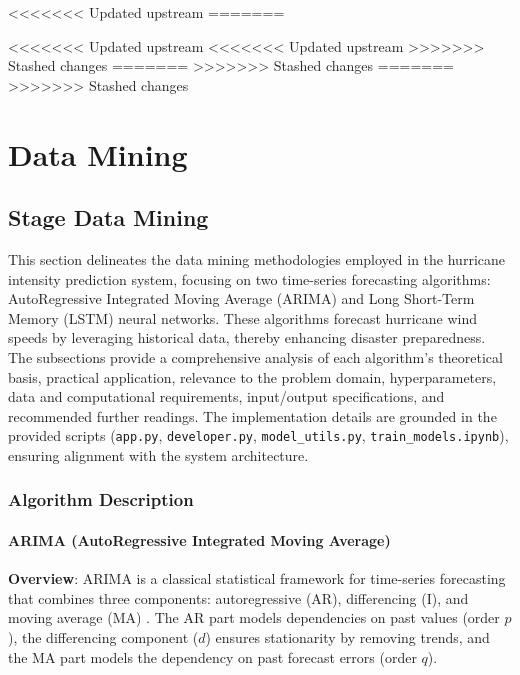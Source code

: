 <<<<<<< Updated upstream
=======
%
%


<<<<<<< Updated upstream
<<<<<<< Updated upstream
>>>>>>> Stashed changes
=======
>>>>>>> Stashed changes
=======
>>>>>>> Stashed changes
\chapter{Data Mining}

\section{Stage Data Mining}


This section delineates the data mining methodologies employed in the hurricane intensity prediction system, focusing on two time-series forecasting algorithms: AutoRegressive Integrated Moving Average (ARIMA) and Long Short-Term Memory (LSTM) neural networks. These algorithms forecast hurricane wind speeds by leveraging historical data, thereby enhancing disaster preparedness. The subsections provide a comprehensive analysis of each algorithm’s theoretical basis, practical application, relevance to the problem domain, hyperparameters, data and computational requirements, input/output specifications, and recommended further readings. The implementation details are grounded in the provided scripts (\texttt{app.py}, \texttt{developer.py}, \texttt{model\_utils.py}, \texttt{train\_models.ipynb}), ensuring alignment with the system architecture.

\subsection{Algorithm Description}

\subsubsection{ARIMA (AutoRegressive Integrated Moving Average)}

\textbf{Overview}: ARIMA is a classical statistical framework for time-series forecasting that combines three components: autoregressive (AR), differencing (I), and moving average (MA) \cite{BoxEtAl2015}. The AR part models dependencies on past values (order $p$), the differencing component ($d$) ensures stationarity by removing trends, and the MA part models the dependency on past forecast errors (order $q$).

